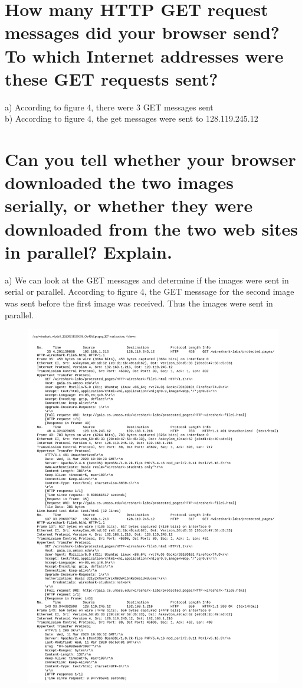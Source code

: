\documentclass{article}
\begin{document}
\section{How many HTTP GET request messages did your browser send? To which
Internet addresses were these GET requests sent?}
a)  According to figure 4, there were 3 GET messages sent\\
\newline b)  According to figure 4, the get messages were sent to 128.119.245.12\\
\section{Can you tell whether your browser downloaded the two images serially, or
whether they were downloaded from the two web sites in parallel? Explain.}
a)  We can look at the GET messages and determine if the images were sent in serial or parallel.  According to figure 4, the GET messsage for the second image was sent before the first image was received.  Thus the images were sent in parallel.\\
\begin{figure}[h!]
\centering
\includegraphics[scale=0.45]{Q18-19Output.pdf}
\caption{}
\end{figure}
\end{document}
